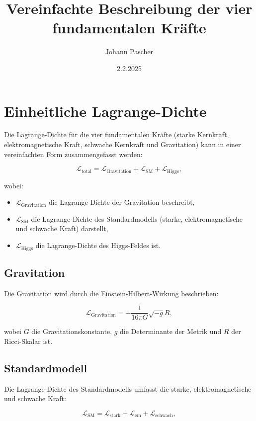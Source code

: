 \documentclass{article}
\title{Vereinfachte Beschreibung der vier fundamentalen Kräfte}
\author{Johann Pascher}
\date{2.2.2025}
\begin{document}
	
	\maketitle
	
	\section{Einheitliche Lagrange-Dichte}
	
	Die Lagrange-Dichte für die vier fundamentalen Kräfte (starke Kernkraft, elektromagnetische Kraft, schwache Kernkraft und Gravitation) kann in einer vereinfachten Form zusammengefasst werden:
	
	\begin{equation}
		\mathcal{L}_\text{total} = \mathcal{L}_\text{Gravitation} + \mathcal{L}_\text{SM} + \mathcal{L}_\text{Higgs},
	\end{equation}
	
	wobei:
	\begin{itemize}
		\item $\mathcal{L}_\text{Gravitation}$ die Lagrange-Dichte der Gravitation beschreibt,
		\item $\mathcal{L}_\text{SM}$ die Lagrange-Dichte des Standardmodells (starke, elektromagnetische und schwache Kraft) darstellt,
		\item $\mathcal{L}_\text{Higgs}$ die Lagrange-Dichte des Higgs-Feldes ist.
	\end{itemize}
	
	\subsection{Gravitation}
	Die Gravitation wird durch die Einstein-Hilbert-Wirkung beschrieben:
	
	\begin{equation}
		\mathcal{L}_\text{Gravitation} = -\frac{1}{16\pi G} \sqrt{-g} R,
	\end{equation}
	
	wobei $G$ die Gravitationskonstante, $g$ die Determinante der Metrik und $R$ der Ricci-Skalar ist.
	
	\subsection{Standardmodell}
	Die Lagrange-Dichte des Standardmodells umfasst die starke, elektromagnetische und schwache Kraft:
	
	\begin{equation}
		\mathcal{L}_\text{SM} = \mathcal{L}_\text{stark} + \mathcal{L}_\text{em} + \mathcal{L}_\text{schwach},
	\end{equation}
	
\end{document}
